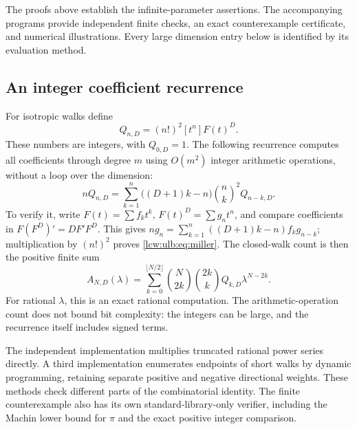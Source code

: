 \documentclass[11pt,letterpaper]{article}
\theoremstyle{remark}\newtheorem{remark}[theorem]{Remark}
\begin{document}
The proofs above establish the infinite-parameter assertions. The
accompanying programs provide independent finite checks, an exact
counterexample certificate, and numerical illustrations. Every large
dimension entry below is identified by its evaluation method.

\subsection{An integer coefficient recurrence}

For isotropic walks define
\[
 Q_{n,D}=(n!)^2[t^n]F(t)^D.
\]
These numbers are integers, with $Q_{0,D}=1$. The following recurrence
computes all coefficients through degree $m$ using $O(m^2)$ integer
arithmetic operations, without a loop over the dimension:
\begin{equation}\label{lcw:ulb:eq:miller}
 nQ_{n,D}=\sum_{k=1}^n\bigl((D+1)k-n\bigr)
                \binom nk^2 Q_{n-k,D}.
\end{equation}
To verify it, write $F(t)=\sum f_kt^k$, $F(t)^D=\sum g_nt^n$,
and compare coefficients in $F(F^D)'=DF'F^D$. This gives
$ng_n=\sum_{k=1}^n((D+1)k-n)f_kg_{n-k}$; multiplication by
$(n!)^2$ proves \eqref{lcw:ulb:eq:miller}. The closed-walk count is
then the positive finite sum
\begin{equation}\label{lcw:ulb:eq:exactsum}
 A_{N,D}(\lambda)=\sum_{k=0}^{\lfloor N/2\rfloor}
    \binom N{2k}\binom{2k}{k}Q_{k,D}\lambda^{N-2k}.
\end{equation}
For rational $\lambda$, this is an exact rational computation.
The arithmetic-operation count does not bound bit complexity: the
integers can be large, and the recurrence itself includes signed terms.

The independent implementation multiplies truncated rational power
series directly. A third implementation enumerates endpoints of short
walks by dynamic programming, retaining separate positive and negative
directional weights. These methods check different parts of the
combinatorial identity. The finite counterexample also has its own
standard-library-only verifier, including the Machin lower bound for
$\pi$ and the exact positive integer comparison.
\end{document}
